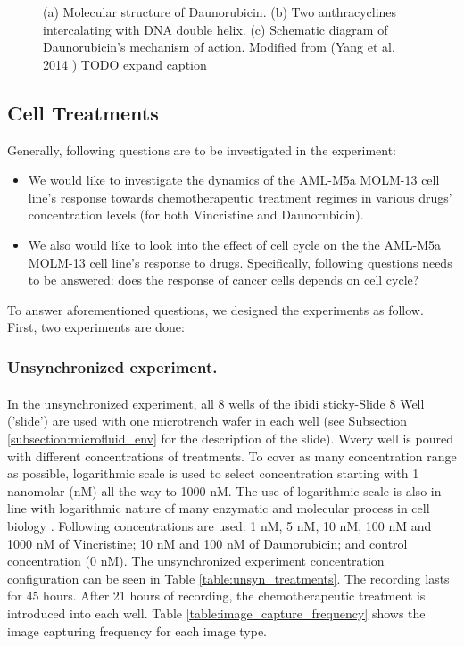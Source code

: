 \documentclass[pdftex,12pt,a4paper]{report}
\begin{document}
\begin{figure}[H]
\begin{subfigure}{.9\textwidth}
  \caption{}
  \label{fig:dauno_mechanism}
\end{subfigure}
\caption{(a) Molecular structure of Daunorubicin. (b) Two anthracyclines intercalating with DNA double helix. (c) Schematic diagram of Daunorubicin's mechanism of action. Modified from (Yang et al, 2014 \cite{yang2014doxorubicin}) TODO expand caption}
\label{fig:daunos}
\end{figure}

\subsection{Cell Treatments}
\label{subsection:cell_treatments}

Generally, following questions are to be investigated in the experiment:

\begin{itemize}
\item We would like to investigate the dynamics of the AML-M5a MOLM-13 cell line's response towards chemotherapeutic treatment regimes in various drugs' concentration levels (for both Vincristine and Daunorubicin).
\item We also would like to look into the effect of cell cycle on the the AML-M5a MOLM-13 cell line's response to drugs. Specifically, following questions needs to be answered: does the response of cancer cells depends on cell cycle?
\end{itemize}

To answer aforementioned questions, we designed the experiments as follow. First, two experiments are done:

\subsubsection*{Unsynchronized experiment.}

In the unsynchronized experiment, all 8 wells of the ibidi\textsuperscript{\textregistered} sticky-Slide 8 Well ('slide') are used with one microtrench wafer in each well (see Subsection \ref{subsection:microfluid_env} for the description of the slide). Wvery well is poured with different concentrations of treatments. To cover as many concentration range as possible, logarithmic scale is used to select concentration starting with 1 nanomolar (nM) all the way to 1000 nM. The use of logarithmic scale is also in line with logarithmic nature of many enzymatic and molecular process in cell biology \cite{wilkinson1961statistical, savageau1969biochemical}. Following concentrations are used:  1 nM, 5 nM, 10 nM, 100 nM and 1000 nM of Vincristine; 10 nM and 100 nM of Daunorubicin; and control concentration (0 nM). The unsynchronized experiment concentration configuration can be seen in Table \ref{table:unsyn_treatments}. The recording lasts for 45 hours. After 21 hours of recording, the chemotherapeutic treatment is introduced into each well. Table \ref{table:image_capture_frequency} shows the image capturing frequency for each image type.
\end{document}
